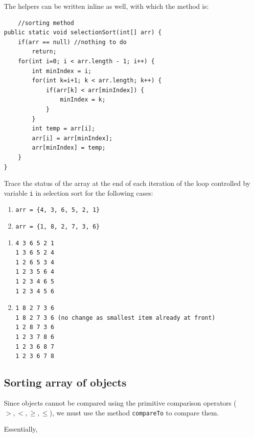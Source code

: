 \newpage
The helpers can be written inline as well, with which the method is:

\begin{lstlisting}
	//sorting method
public static void selectionSort(int[] arr) {
	if(arr == null) //nothing to do
		return;
	for(int i=0; i < arr.length - 1; i++) {
		int minIndex = i;
		for(int k=i+1; k < arr.length; k++) {
			if(arr[k] < arr[minIndex]) {
				minIndex = k;
			}
		}
		int temp = arr[i];
		arr[i] = arr[minIndex];
		arr[minIndex] = temp;
	}
}
\end{lstlisting}

\begin{exercise}
Trace the status of the array at the end of each iteration of the loop controlled by variable \texttt{i} in selection sort for the following cases:

\begin{enumerate}
\item \texttt{arr = \{4, 3, 6, 5, 2, 1\}}
\item \texttt{arr = \{1, 8, 2, 7, 3, 6\}}
\end{enumerate}
\end{exercise}

\begin{answer}
\begin{enumerate}
\item 
\begin{verbatim}
4 3 6 5 2 1
1 3 6 5 2 4
1 2 6 5 3 4
1 2 3 5 6 4
1 2 3 4 6 5
1 2 3 4 5 6	
\end{verbatim}

\item 
\begin{verbatim}
1 8 2 7 3 6
1 8 2 7 3 6 (no change as smallest item already at front)
1 2 8 7 3 6
1 2 3 7 8 6
1 2 3 6 8 7
1 2 3 6 7 8
\end{verbatim}
\end{enumerate}
\end{answer}

	\newpage

\subsection{Sorting array of objects}

Since objects cannot be compared using the primitive comparison operators ($>, <, \geq, \leq$), we must use the method \texttt{compareTo} to compare them.

Essentially, 

